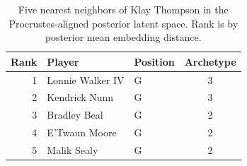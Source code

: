 \begin{table}[htbp]
  \centering\small
  \begin{tabular}{rllc}
    \toprule
    Rank & Player & Position & Archetype \\
    \midrule
    1 & Lonnie Walker IV & G & 3 \\
    2 & Kendrick Nunn & G & 3 \\
    3 & Bradley Beal & G & 2 \\
    4 & E'Twaun Moore & G & 2 \\
    5 & Malik Sealy & G & 2 \\
    \bottomrule
  \end{tabular}
  \caption{Five nearest neighbors of Klay Thompson in the Procrustes-aligned posterior latent space. Rank is by posterior mean embedding distance.}
  \label{tab:Klay_Thompson_neighbors}
\end{table}

